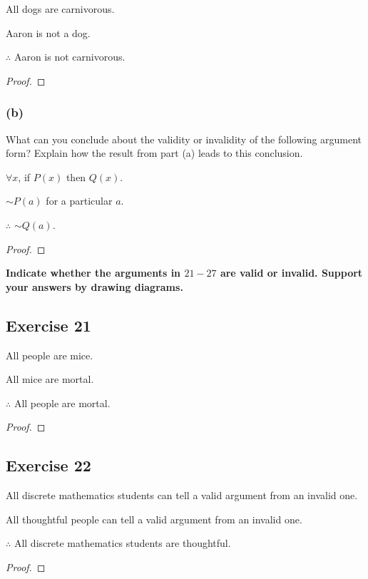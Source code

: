 \documentclass[14pt]{extarticle}
\newcommand{\fa}{\forall}
\begin{document}
All dogs are carnivorous.

Aaron is not a dog.

$\therefore$ Aaron is not carnivorous.

\begin{proof}

\end{proof}

\subsubsection{(b)}
What can you conclude about the validity or invalidity of the following argument form? Explain how the result from part (a) leads to this conclusion.

$\fa x$, if $P(x)$ then $Q(x)$.

$\sim P(a)$ for a particular $a$.

$\therefore$ $\sim Q(a)$.

\begin{proof}

\end{proof}

{\bf \color{cyan} Indicate whether the arguments in $21-27$ are valid or invalid. Support your answers by drawing diagrams.}

\subsection{Exercise 21}
All people are mice.

All mice are mortal.

$\therefore$ All people are mortal.

\begin{proof}

\end{proof}

\subsection{Exercise 22}
All discrete mathematics students can tell a valid argument from an invalid one.

All thoughtful people can tell a valid argument from an invalid one.

$\therefore$ All discrete mathematics students are thoughtful.

\begin{proof}

\end{proof}
\end{document}
